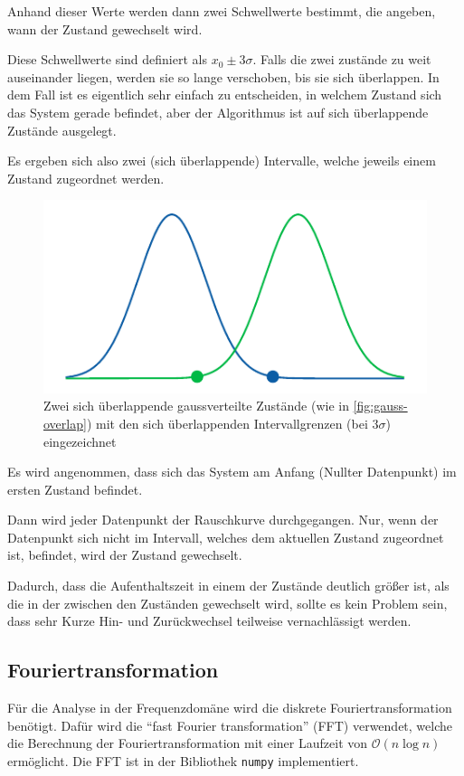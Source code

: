 \documentclass[main.tex]{subfiles}
\begin{document}
Anhand dieser Werte werden dann zwei Schwellwerte bestimmt, die angeben, wann der Zustand gewechselt wird.

Diese Schwellwerte sind definiert als \(x_0 \pm 3\sigma\). Falls die zwei zustände zu weit auseinander liegen, werden sie so lange verschoben, bis sie sich überlappen. 
In dem Fall ist es eigentlich sehr einfach zu entscheiden, in welchem Zustand sich das System gerade befindet, aber der Algorithmus ist auf sich überlappende Zustände ausgelegt.

Es ergeben sich also zwei (sich überlappende) Intervalle, welche jeweils einem Zustand zugeordnet werden.

\begin{figure}[h]
    \centering
    \includegraphics{bilder/plots/theo-vis/bounds.pdf}
    \caption{Zwei sich überlappende gaussverteilte Zustände (wie in \cref{fig:gauss-overlap}) mit den sich überlappenden Intervallgrenzen (bei \(3\sigma\)) eingezeichnet }
\end{figure}


Es wird angenommen, dass sich das System am Anfang (Nullter Datenpunkt) im ersten Zustand befindet.

Dann wird jeder Datenpunkt der Rauschkurve durchgegangen. Nur, wenn der Datenpunkt sich nicht im Intervall, welches dem aktuellen Zustand zugeordnet ist, befindet, wird der Zustand gewechselt. 

Dadurch, dass die Aufenthaltszeit in einem der Zustände deutlich größer ist, als die in der zwischen den Zuständen gewechselt wird, sollte es kein Problem sein, dass sehr Kurze Hin- und Zurückwechsel teilweise vernachlässigt werden. 

\subsection{Fouriertransformation}

Für die Analyse in der Frequenzdomäne wird die diskrete Fouriertransformation
benötigt. Dafür wird die \enquote{fast Fourier transformation} (FFT) verwendet,
welche die Berechnung der Fouriertransformation mit einer Laufzeit von
$\mathcal{O}(n \log n)$ ermöglicht. Die FFT ist in der Bibliothek
\texttt{numpy} \cite{numpy-fft} implementiert.
\end{document}
